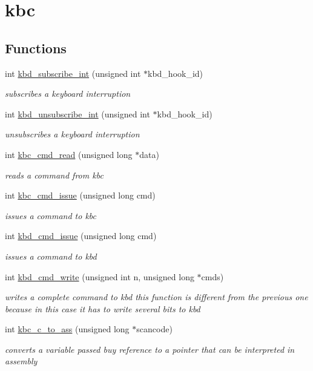 \hypertarget{group__kbc}{}\section{kbc}
\label{group__kbc}
\subsection*{Functions}
\begin{DoxyCompactItemize}
\item 
int \hyperlink{group__kbc_ga8efa408da2468eaa11a0c515dfa8d79f}{kbd\+\_\+subscribe\+\_\+int} (unsigned int $\ast$kbd\+\_\+hook\+\_\+id)
\begin{DoxyCompactList}\small\item\em subscribes a keyboard interruption \end{DoxyCompactList}\item 
int \hyperlink{group__kbc_ga32ab97f6b806fa3a0524e62af55aeb0e}{kbd\+\_\+unsubscribe\+\_\+int} (unsigned int $\ast$kbd\+\_\+hook\+\_\+id)
\begin{DoxyCompactList}\small\item\em unsubscribes a keyboard interruption \end{DoxyCompactList}\item 
int \hyperlink{group__kbc_gad9d71d9448d7e3796e22f696863b7453}{kbc\+\_\+cmd\+\_\+read} (unsigned long $\ast$data)
\begin{DoxyCompactList}\small\item\em reads a command from kbc \end{DoxyCompactList}\item 
int \hyperlink{group__kbc_ga54b191a4ae0a5ed8d23e31cd50eb4868}{kbc\+\_\+cmd\+\_\+issue} (unsigned long cmd)
\begin{DoxyCompactList}\small\item\em issues a command to kbc \end{DoxyCompactList}\item 
int \hyperlink{group__kbc_gaa8b3453e895793f84cfc40e9cf04dd03}{kbd\+\_\+cmd\+\_\+issue} (unsigned long cmd)
\begin{DoxyCompactList}\small\item\em issues a command to kbd \end{DoxyCompactList}\item 
int \hyperlink{group__kbc_ga9a48bf91bd53208baa5627dd2a39e24d}{kbd\+\_\+cmd\+\_\+write} (unsigned int n, unsigned long $\ast$cmds)
\begin{DoxyCompactList}\small\item\em writes a complete command to kbd this function is different from the previous one because in this case it has to write several bits to kbd \end{DoxyCompactList}\item 
int \hyperlink{group__kbc_gac76f743c998918d5ff65403aa35c8b05}{kbc\+\_\+c\+\_\+to\+\_\+ass} (unsigned long $\ast$scancode)
\begin{DoxyCompactList}\small\item\em converts a variable passed buy reference to a pointer that can be interpreted in assembly \end{DoxyCompactList}\end{DoxyCompactItemize}


